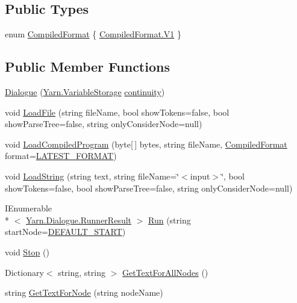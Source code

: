 \subsection*{Public Types}
\begin{DoxyCompactItemize}
\item 
enum \hyperlink{a00072_a903f18cdcc66c28ceab5a43c41fe074d}{Compiled\-Format} \{ \hyperlink{a00072_a903f18cdcc66c28ceab5a43c41fe074dab4daca084ad9eabfc8de231929477ed6}{Compiled\-Format.\-V1}
 \}
\end{DoxyCompactItemize}
\subsection*{Public Member Functions}
\begin{DoxyCompactItemize}
\item 
\hyperlink{a00072_a349debf4c4b8d48e3d80ff31ad380b0e}{Dialogue} (\hyperlink{a00166}{Yarn.\-Variable\-Storage} \hyperlink{a00072_ae94eaa4b03b432422f5d205fabe37ff5}{continuity})
\item 
void \hyperlink{a00072_af868f7f6928d122ca1d1857be433d92b}{Load\-File} (string file\-Name, bool show\-Tokens=false, bool show\-Parse\-Tree=false, string only\-Consider\-Node=null)
\item 
void \hyperlink{a00072_a4bc1ceca26754dc3ec0a2281dfee26ce}{Load\-Compiled\-Program} (byte\mbox{[}$\,$\mbox{]} bytes, string file\-Name, \hyperlink{a00072_a903f18cdcc66c28ceab5a43c41fe074d}{Compiled\-Format} format=\hyperlink{a00072_a3bc83587462ade6a2f7f42cb7576e50e}{L\-A\-T\-E\-S\-T\-\_\-\-F\-O\-R\-M\-A\-T})
\item 
void \hyperlink{a00072_a7b66187877ec8a2bfee2298d3dd16706}{Load\-String} (string text, string file\-Name=\char`\"{}$<$input$>$\char`\"{}, bool show\-Tokens=false, bool show\-Parse\-Tree=false, string only\-Consider\-Node=null)
\item 
I\-Enumerable\\*
$<$ \hyperlink{a00132}{Yarn.\-Dialogue.\-Runner\-Result} $>$ \hyperlink{a00072_aead84ee50cb113ca45724894290ce9c2}{Run} (string start\-Node=\hyperlink{a00072_a1b643f15f734090e6a58cbf13dafd28f}{D\-E\-F\-A\-U\-L\-T\-\_\-\-S\-T\-A\-R\-T})
\item 
void \hyperlink{a00072_a7a6cabe5612fdcdc4619460431f85112}{Stop} ()
\item 
Dictionary$<$ string, string $>$ \hyperlink{a00072_a7c83b1fe5474a6610d39eb525f6fc9ce}{Get\-Text\-For\-All\-Nodes} ()
\item 
string \hyperlink{a00072_a594641914a2b59cc5231645273d18e82}{Get\-Text\-For\-Node} (string node\-Name)

\end{DoxyCompactItemize}
